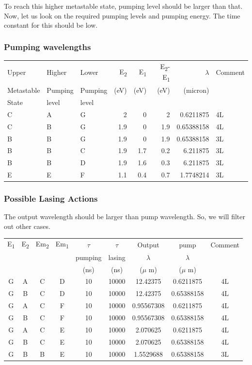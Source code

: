 \documentclass[a4paper,11pt]{article}
\begin{document}
To reach this higher metastable state, pumping level should be larger than that. Now, let us look on the required pumping levels and pumping energy. The time constant for this should be low.

\subsubsection*{Pumping wavelengths}
\label{sec:orgf5047d4}
\begin{center}
\begin{tabular}{lllrrrrl}
\hline
Upper & Higher & Lower & E\textsubscript{2} & E\textsubscript{1} & E\textsubscript{2}-E\textsubscript{1} & \(\lambda\) & Comment\\
Metastable & Pumping & Pumping & (eV) & (eV) & (eV) & (micron) & \\
State & level & level &  &  &  &  & \\
\hline
C & A & G & 2 & 0 & 2 & 0.6211875 & 4L\\
C & B & G & 1.9 & 0 & 1.9 & 0.65388158 & 4L\\
B & B & G & 1.9 & 0 & 1.9 & 0.65388158 & 3L\\
B & B & C & 1.9 & 1.7 & 0.2 & 6.211875 & 3L\\
B & B & D & 1.9 & 1.6 & 0.3 & 6.211875 & 3L\\
E & E & F & 1.1 & 0.4 & 0.7 & 1.7748214 & 3L\\
\hline
\end{tabular}
\end{center}

\subsubsection*{Possible Lasing Actions}
\label{sec:orgb775e12}

The output wavelength should be larger than pump wavelength. So, we will filter out other cases.

\begin{center}
\begin{tabular}{|c|c|c|c|c|c|c|c|c|}
\hline
E\textsubscript{1} & E\textsubscript{2} & Em\textsubscript{2} & Em\textsubscript{1} & \(\tau\) & \(\tau\) & Output & pump & Comment\\
 &  &  &  & pumping & lasing & \(\lambda\) & \(\lambda\) & \\
 &  &  &  & (ns) & (ns) & (\(\mu\) m) & (\(\mu\) m) & \\
\hline
G & A & C & D & 10 & 10000 & 12.42375 & 0.6211875 & 4L\\
G & B & C & D & 10 & 10000 & 12.42375 & 0.65388158 & 4L\\
G & A & C & F & 10 & 10000 & 0.95567308 & 0.6211875 & 4L\\
G & B & C & F & 10 & 10000 & 0.95567308 & 0.65388158 & 4L\\
G & A & C & E & 10 & 10000 & 2.070625 & 0.6211875 & 4L\\
G & B & C & E & 10 & 10000 & 2.070625 & 0.65388158 & 4L\\
G & B & B & E & 10 & 10000 & 1.5529688 & 0.65388158 & 3L\\
\hline
\end{tabular}
\end{center}
\end{document}
